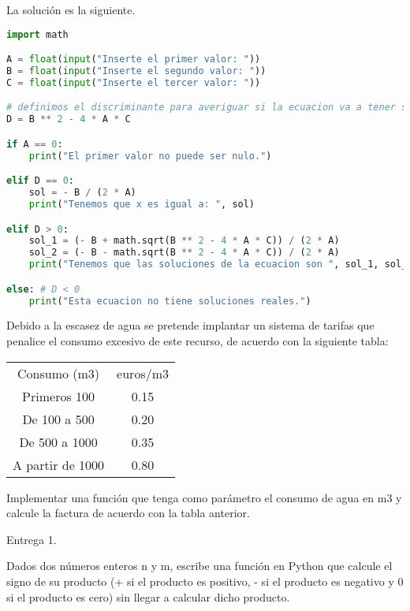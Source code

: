 \documentclass{article}
\begin{document}
\begin{sol}
La solución es la siguiente.
\begin{lstlisting}[language = Python]
import math

A = float(input("Inserte el primer valor: "))
B = float(input("Inserte el segundo valor: "))
C = float(input("Inserte el tercer valor: "))

# definimos el discriminante para averiguar si la ecuacion va a tener solucion o no
D = B ** 2 - 4 * A * C

if A == 0:
	print("El primer valor no puede ser nulo.")

elif D == 0:
	sol = - B / (2 * A)
	print("Tenemos que x es igual a: ", sol)

elif D > 0:
	sol_1 = (- B + math.sqrt(B ** 2 - 4 * A * C)) / (2 * A)
	sol_2 = (- B - math.sqrt(B ** 2 - 4 * A * C)) / (2 * A)
	print("Tenemos que las soluciones de la ecuacion son ", sol_1, sol_2)

else: # D < 0
	print("Esta ecuacion no tiene soluciones reales.")
\end{lstlisting}
\end{sol}

\begin{ej}
Debido a la escasez de agua se pretende implantar un sistema de tarifas que penalice el consumo excesivo de este recurso, de acuerdo con la siguiente tabla:
\begin{center}
\begin{tabular}{c c}
	Consumo (m3) & euros/m3 \\
	Primeros 100 & 0.15 \\
	De 100 a 500 & 0.20 \\
	De 500 a 1000 & 0.35 \\
	A partir de 1000 & 0.80
\end{tabular}
\end{center}
 Implementar una función que tenga como parámetro el consumo de agua en m3 y calcule la factura de acuerdo con la tabla anterior.
\end{ej}

\begin{sol}
Entrega 1.
\end{sol}

\begin{ej}
Dados dos números enteros n y m, escribe una función en Python que calcule el signo de su producto (+ si el producto es positivo, - si el producto es negativo y 0 si el producto es cero) sin llegar a calcular dicho producto.
\end{ej}
\end{document}
